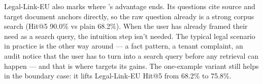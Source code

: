Legal-Link-EU also marks where \hyre{}'s advantage ends. Its questions cite
source and target document anchors directly, so the raw question already
is a strong corpus search (Hit@5 90.0\% vs plain \hyre{} 68.2\%). When the
user has already framed their need as a search query, the intuition step
isn't needed. The typical legal scenario in practice is the other way
around --- a fact pattern, a tenant complaint, an audit notice that the
user has to turn into a search query before any retrieval can happen ---
and that is where \hyre{} targets its gains. The one-example variant still
helps in the boundary case: it lifts Legal-Link-EU Hit@5 from 68.2\% to
75.8\%.

